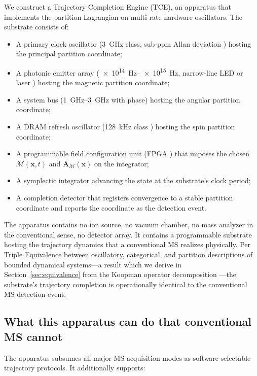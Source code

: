 \documentclass[twocolumn,11pt,a4paper]{article}
\theoremstyle{definition}
\theoremstyle{remark}
\newcommand{\Depth}{\mathcal{M}}
\newcommand{\Apartition}{\mathbf{A}_{\mathcal{M}}}
\begin{document}
We construct a Trajectory Completion Engine (TCE), an apparatus that implements the partition Lagrangian on multi-rate hardware oscillators. The substrate consists of:

\begin{itemize}[nosep]
    \item A primary clock oscillator (\SI{3}{GHz} class, sub-ppm Allan deviation \citep{allan1966,vig1999}) hosting the principal partition coordinate;
    \item A photonic emitter array (\SIrange{e14}{e15}{Hz}, narrow-line LED or laser \citep{ludlow2015,diddams2020}) hosting the magnetic partition coordinate;
    \item A system bus (\SIrange{1}{3}{GHz} with phase) hosting the angular partition coordinate;
    \item A DRAM refresh oscillator (\SI{128}{kHz} class \citep{liu2012}) hosting the spin partition coordinate;
    \item A programmable field configuration unit (FPGA \citep{xilinx2019,intel2020}) that imposes the chosen $\Depth(\mathbf{x}, t)$ and $\Apartition(\mathbf{x})$ on the integrator;
    \item A symplectic integrator \citep{verlet1967,yoshida1990,hairer2006} advancing the state at the substrate's clock period;
    \item A completion detector that registers convergence to a stable partition coordinate and reports the coordinate as the detection event.
\end{itemize}

The apparatus contains no ion source, no vacuum chamber, no mass analyzer in the conventional sense, no detector array. It contains a programmable substrate hosting the trajectory dynamics that a conventional MS realizes physically. Per Triple Equivalence between oscillatory, categorical, and partition descriptions of bounded dynamical systems---a result which we derive in Section~\ref{sec:equivalence} from the Koopman operator decomposition \citep{koopman1931,mezic2005}---the substrate's trajectory completion is operationally identical to the conventional MS detection event.

\subsection{What this apparatus can do that conventional MS cannot}

The apparatus subsumes all major MS acquisition modes \citep{gillet2012,lange2008,peterson2012,stahl1996} as software-selectable trajectory protocols. It additionally supports:
\end{document}
